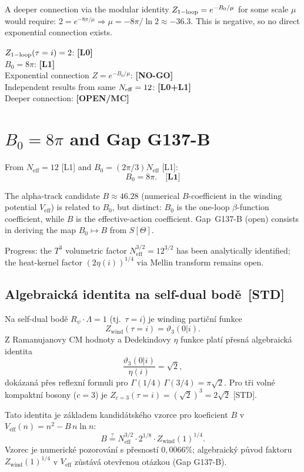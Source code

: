 \documentclass[12pt,a4paper]{article}
\begin{document}
A deeper connection via the modular identity
$Z_{\rm 1-loop} = e^{-B_0/\mu}$ for some scale $\mu$ would require:
$2 = e^{-8\pi/\mu} \Rightarrow \mu = -8\pi/\ln 2 \approx -36.3$.
This is negative, so no direct exponential connection exists.

\begin{statusbox}
$Z_{\rm 1-loop}(\tau=i) = 2$: \textbf{[L0]}\\
$B_0 = 8\pi$: \textbf{[L1]}\\
Exponential connection $Z = e^{-B_0/\mu}$: \textbf{[NO-GO]}\\
Independent results from same $N_{\rm eff}=12$: \textbf{[L0+L1]}\\
Deeper connection: \textbf{[OPEN/MC]}
\end{statusbox}

\section{$B_0 = 8\pi$ and Gap G137-B}
From \(N_{\mathrm{eff}}=12\) [L1] and \(B_0=(2\pi/3)N_{\mathrm{eff}}\) [L1]:
\[
  B_0 = 8\pi. \quad \textbf{[L1]}
\]

The alpha-track candidate \(B\approx 46.28\) (numerical \(B\)-coefficient
in the winding potential \(V_{\mathrm{eff}}\)) is related to \(B_0\), but distinct:
\(B_0\) is the one-loop \(\beta\)-function coefficient, while \(B\) is the
effective-action coefficient. Gap~G137-B (open) consists in deriving
the map \(B_0 \mapsto B\) from \(S[\Theta]\).

Progress: the \(T^3\) volumetric factor \(N_{\mathrm{eff}}^{3/2}=12^{3/2}\)
has been analytically identified; the heat-kernel factor \((2\eta(i))^{1/4}\)
via Mellin transform remains open.

\subsection{Algebraická identita na self-dual bodě \,[STD]}

Na self-dual bodě $R_\psi\cdot\Lambda=1$ (tj.\ $\tau=i$) je winding
partiční funkce
\[
Z_{\mathrm{wind}}(\tau=i) = \vartheta_3(0|i).
\]
Z Ramanujanovy CM hodnoty a Dedekindovy $\eta$ funkce platí přesná
algebraická identita
\[
\frac{\vartheta_3(0|i)}{\eta(i)} = \sqrt{2},
\]
dokázaná přes reflexní formuli pro $\Gamma(1/4)\,\Gamma(3/4)=\pi\sqrt{2}$.
Pro tři volné kompaktní bosony ($c=3$) je
$Z_{c=3}(\tau=i) = (\sqrt{2})^3 = 2\sqrt{2}$ [STD].

Tato identita je základem kandidátského vzorce pro koeficient $B$
v $V_{\mathrm{eff}}(n) = n^2 - B\,n\ln n$:
\[
B \stackrel{?}{=}
  N_{\mathrm{eff}}^{3/2}\cdot 2^{1/8}\cdot Z_{\mathrm{wind}}(1)^{1/4}.
\]
Vzorec je numerické pozorování s přesností $0{,}0066\%$; algebraický
původ faktoru $Z_{\mathrm{wind}}(1)^{1/4}$ v $V_{\mathrm{eff}}$ zůstává
otevřenou otázkou (Gap G137-B).
\end{document}
